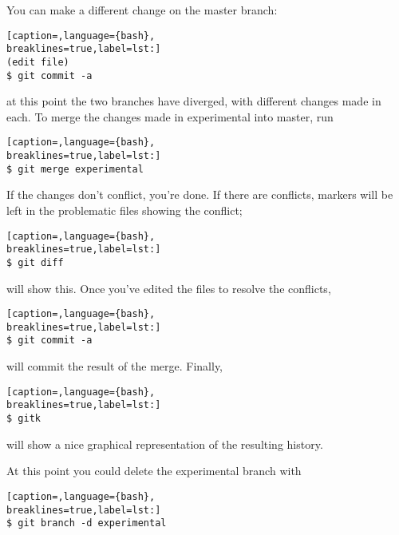 You can make a different change on the master branch:

\lstset{basicstyle=\scriptsize, numbers=none, captionpos=b, tabsize=4}
\begin{lstlisting}[caption=,language={bash},
breaklines=true,label=lst:]
(edit file)
$ git commit -a
\end{lstlisting}

at this point the two branches have diverged, with different changes made in
each. To merge the changes made in experimental into master, run

\lstset{basicstyle=\scriptsize, numbers=none, captionpos=b, tabsize=4}
\begin{lstlisting}[caption=,language={bash},
breaklines=true,label=lst:]
$ git merge experimental
\end{lstlisting}

If the changes don't conflict, you're done. If there are conflicts, markers
will be left in the problematic files showing the conflict;

\lstset{basicstyle=\scriptsize, numbers=none, captionpos=b, tabsize=4}
\begin{lstlisting}[caption=,language={bash},
breaklines=true,label=lst:]
$ git diff
\end{lstlisting}

will show this. Once you've edited the files to resolve the conflicts,

\lstset{basicstyle=\scriptsize, numbers=none, captionpos=b, tabsize=4}
\begin{lstlisting}[caption=,language={bash},
breaklines=true,label=lst:]
$ git commit -a
\end{lstlisting}

will commit the result of the merge. Finally,

\lstset{basicstyle=\scriptsize, numbers=none, captionpos=b, tabsize=4}
\begin{lstlisting}[caption=,language={bash},
breaklines=true,label=lst:]
$ gitk
\end{lstlisting}

will show a nice graphical representation of the resulting history.

At this point you could delete the experimental branch with

\lstset{basicstyle=\scriptsize, numbers=none, captionpos=b, tabsize=4}
\begin{lstlisting}[caption=,language={bash},
breaklines=true,label=lst:]
$ git branch -d experimental
\end{lstlisting}


